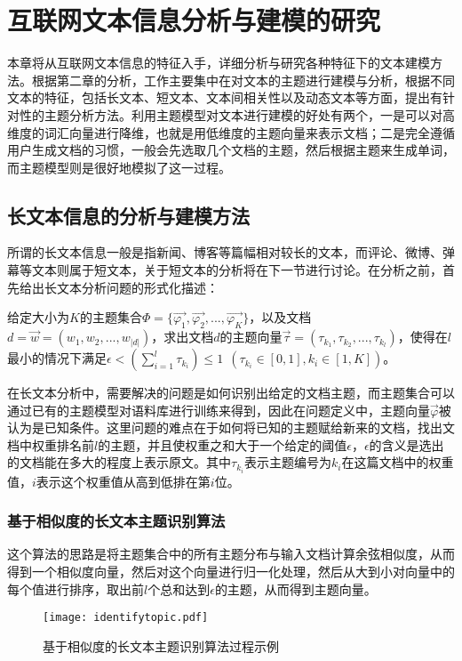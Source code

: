 \section{互联网文本信息分析与建模的研究}
本章将从互联网文本信息的特征入手，详细分析与研究各种特征下的文本建模方法。根据第二章的分析，工作主要集中在对文本的主题进行建模与分析，根据不同文本的特征，包括长文本、短文本、文本间相关性以及动态文本等方面，提出有针对性的主题分析方法。利用主题模型对文本进行建模的好处有两个，一是可以对高维度的词汇向量进行降维，也就是用低维度的主题向量来表示文档；二是完全遵循用户生成文档的习惯，一般会先选取几个文档的主题，然后根据主题来生成单词，而主题模型则是很好地模拟了这一过程。

\subsection{长文本信息的分析与建模方法}
所谓的长文本信息一般是指新闻、博客等篇幅相对较长的文本，而评论、微博、弹幕等文本则属于短文本，关于短文本的分析将在下一节进行讨论。在分析之前，首先给出长文本分析问题的形式化描述：

\begin{mydef}[长文本主题识别问题]
  给定大小为$K$的主题集合$\Phi=\{\vec{\varphi_1},\vec{\varphi_2},...,\vec{\varphi_K}\}$，以及文档$d=\vec{w}=(w_1,w_2,...,w_{|d|})$，求出文档$d$的主题向量$\vec{\tau}=(\tau_{k_1},\tau_{k_2},...,\tau_{k_l})$，使得在$l$最小的情况下满足$\epsilon<(\sum_{i=1}^{l}\tau_{k_i})\le 1~~(\tau_{k_i}\in [0,1],k_i\in [1,K])$。
\end{mydef}

在长文本分析中，需要解决的问题是如何识别出给定的文档主题，而主题集合可以通过已有的主题模型对语料库进行训练来得到，因此在问题定义中，主题向量$\vec{\varphi}$被认为是已知条件。这里问题的难点在于如何将已知的主题赋给新来的文档，找出文档中权重排名前$l$的主题，并且使权重之和大于一个给定的阈值$\epsilon$，$\epsilon$的含义是选出的文档能在多大的程度上表示原文。其中$\tau_{k_i}$表示主题编号为$k_i$在这篇文档中的权重值，$i$表示这个权重值从高到低排在第$i$位。

\subsubsection{基于相似度的长文本主题识别算法}
这个算法的思路是将主题集合中的所有主题分布与输入文档计算余弦相似度，从而得到一个相似度向量，然后对这个向量进行归一化处理，然后从大到小对向量中的每个值进行排序，取出前$l$个总和达到$\epsilon$的主题，从而得到主题向量。

\begin{figure}[ht]
\centering
\texttt{[image: identifytopic.pdf]}
\caption{基于相似度的长文本主题识别算法过程示例}
\label{fig:identifytopic}
\end{figure}

